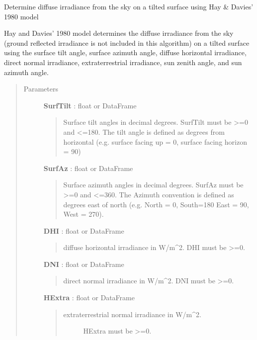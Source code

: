 \documentclass[letterpaper,10pt,english]{sphinxmanual}
\begin{document}
\begin{fulllineitems}
\label{stubs/pvlib.pvl_haydavies1980:pvlib.pvl_haydavies1980}
Determine diffuse irradiance from the sky on a tilted surface using Hay \& Davies' 1980 model

Hay and Davies' 1980 model determines the diffuse irradiance from the sky
(ground reflected irradiance is not included in this algorithm) on a
tilted surface using the surface tilt angle, surface azimuth angle,
diffuse horizontal irradiance, direct normal irradiance, 
extraterrestrial irradiance, sun zenith angle, and sun azimuth angle.
\begin{quote}\begin{description}
\item[{Parameters}] \leavevmode
\textbf{SurfTilt} : float or DataFrame
\begin{quote}

Surface tilt angles in decimal degrees.
SurfTilt must be \textgreater{}=0 and \textless{}=180. The tilt angle is defined as
degrees from horizontal (e.g. surface facing up = 0, surface facing
horizon = 90)
\end{quote}

\textbf{SurfAz} : float or DataFrame
\begin{quote}

Surface azimuth angles in decimal degrees.
SurfAz must be \textgreater{}=0 and \textless{}=360. The Azimuth convention is defined
as degrees east of north (e.g. North = 0, South=180 East = 90, West = 270).
\end{quote}

\textbf{DHI} : float or DataFrame
\begin{quote}

diffuse horizontal irradiance in W/m\textasciicircum{}2. 
DHI must be \textgreater{}=0.
\end{quote}

\textbf{DNI} : float or DataFrame
\begin{quote}

direct normal irradiance in W/m\textasciicircum{}2. 
DNI must be \textgreater{}=0.
\end{quote}

\textbf{HExtra} : float or DataFrame
\begin{quote}
\begin{description}
\item[{extraterrestrial normal irradiance in W/m\textasciicircum{}2. }] \leavevmode
HExtra must be \textgreater{}=0.


\end{description}
\end{quote}
\end{description}
\end{quote}
\end{fulllineitems}
\end{document}
